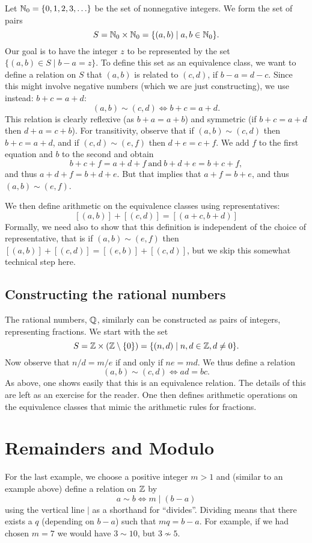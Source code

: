 Let ${\mathbb N}_0=\{0,1,2,3,\ldots\}$ be the set of nonnegative integers. We form
the set of pairs
\[
S={\mathbb N}_0\times{\mathbb N}_0=\{(a,b)\mid a,b\in{\mathbb N}_0\}.
\]
Our goal is to have the integer $z$ to be represented by the set
$\{(a,b)\in S\mid b-a=z\}$. To define this set as an equivalence class, we
want to define a relation on $S$ that $(a,b)$ is related to
$(c,d)$, if $b-a=d-c$. Since this might involve negative numbers (which we
are just constructing), we use instead: $b+c=a+d$:
\[
(a,b)\sim(c,d)\Leftrightarrow b+c=a+d.
\]
This relation is clearly reflexive (as $b+a=a+b$) and symmetric (if
$b+c=a+d$ then $d+a=c+b$). For transitivity, observe that if
$(a,b)\sim(c,d)$ then $b+c=a+d$, and if $(c,d)\sim(e,f)$ then $d+e=c+f$. We
add $f$ to the first equation and $b$ to the second and obtain
\[
b+c+f=a+d+f\ \mbox{and}\ b+d+e=b+c+f,
\]
and thus $a+d+f=b+d+e$. But that implies that $a+f=b+e$, and thus
$(a,b)\sim(e,f)$.

We then define arithmetic on the equivalence classes using representatives:
\[
[(a,b)]+[(c,d)]=[(a+c,b+d)]
\]
Formally, we need also to show that this definition is independent of the
choice of representative, that is if $(a,b)\sim(e,f)$ then
$[(a,b)]+[(c,d)]=[(e,b)]+[(c,d)]$, but we skip this somewhat technical step
here.
\bigskip

\subsection{Constructing the rational numbers}

The rational numbers, ${\mathbb Q}$, similarly can be constructed as pairs of
integers,
representing fractions. We start with the set
\[
S={\mathbb Z}\times ({\mathbb Z}\setminus\{0\})=\{(n,d)\mid n,d\in{\mathbb Z},d\not=0\}.
\]
Now observe that $n/d=m/e$ if and only if $ne=md$. We thus define a relation
\[
(a,b)\sim(c,d)\Leftrightarrow ad=bc.
\]
As above, one shows easily that this is an equivalence relation. The details
of this are left as an exercise for the reader. One then
defines arithmetic operations on the equivalence classes that mimic the
arithmetic rules for fractions.

\section{Remainders and Modulo}

For the last example, we choose a positive integer $m>1$ and (similar to an
example above) define a relation on ${\mathbb Z}$ by
\[
a\sim b\Leftrightarrow m\mid (b-a)
\]
using the vertical line $\mid$ as a shorthand for ``divides''.  Dividing
means that there exists a $q$ (depending on $b-a$) such that $mq=b-a$.
For example, if we had chosen $m=7$ we would have $3\sim 10$, but $3\not\sim
5$.

